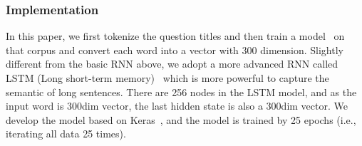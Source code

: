 	
	\par
	

	 
	

	
	\subsubsection{Implementation}
	In this paper, we first tokenize the question titles and then train a model~\cite{??} on that corpus and convert each word into a vector with 300 dimension.
	Slightly different from the basic RNN above, we adopt a more advanced RNN called LSTM (Long short-term memory)~\cite{??} which is more powerful to capture the semantic of long sentences.
	There are 256 nodes in the LSTM model, and as the input word is 300dim vector, the last hidden state is also a 300dim vector.
	We develop the model based on Keras~\cite{??}, and the model is trained by 25 epochs (i.e., iterating all data 25 times).

	 
